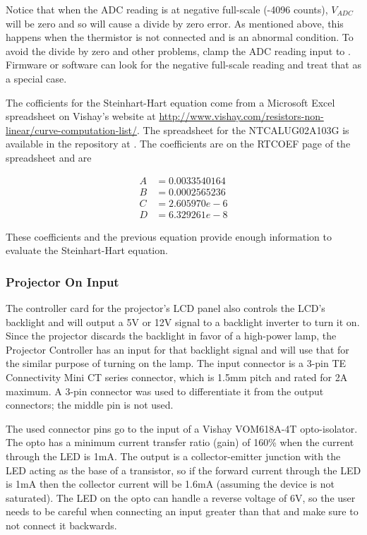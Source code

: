 \documentclass{article}
\begin{document}
Notice that when the ADC reading is at negative full-scale (-4096 counts), $V_{ADC}$ will be zero
and so will cause a divide by zero error.  As mentioned above, this happens when the thermistor is
not connected and is an abnormal condition.  To avoid the divide by zero and other problems, clamp
the ADC reading input to .  Firmware or software can look for the negative full-scale
reading and treat that as a special case.

The cofficients for the Steinhart-Hart equation come from a Microsoft Excel spreadsheet on Vishay's
website at \url{http://www.vishay.com/resistors-non-linear/curve-computation-list/}.  The
spreadsheet for the NTCALUG02A103G is available in the repository at
.  The coefficients are on the RTCOEF page of the
spreadsheet and are

\begin{align*}
    A &= 0.0033540164 \\
    B &= 0.0002565236 \\
    C &= 2.605970e-6 \\
    D &= 6.329261e-8
\end{align*}

These coefficients and the previous equation provide enough information to evaluate the
Steinhart-Hart equation.

\subsubsection{Projector On Input} \label{sssec:PJOnInput}
The controller card for the projector's LCD panel also controls the LCD's backlight and will output
a 5V or 12V signal to a backlight inverter to turn it on.  Since the projector discards the
backlight in favor of a high-power lamp, the Projector Controller has an input for that backlight
signal and will use that for the similar purpose of turning on the lamp.  The input connector is a
3-pin TE Connectivity Mini CT series connector, which is 1.5mm pitch and rated for 2A maximum.  A
3-pin connector was used to differentiate it from the output connectors; the middle pin is not used.

The used connector pins go to the input of a Vishay VOM618A-4T opto-isolator. The opto has a minimum
current transfer ratio (gain) of 160\% when the current through the LED is 1mA.  The output is a
collector-emitter junction with the LED acting as the base of a transistor, so if the forward
current through the LED is 1mA then the collector current will be 1.6mA (assuming the device is not
saturated).  The LED on the opto can handle a reverse voltage of 6V, so the user needs to be careful
when connecting an input greater than that and make sure to not connect it backwards.
\end{document}
